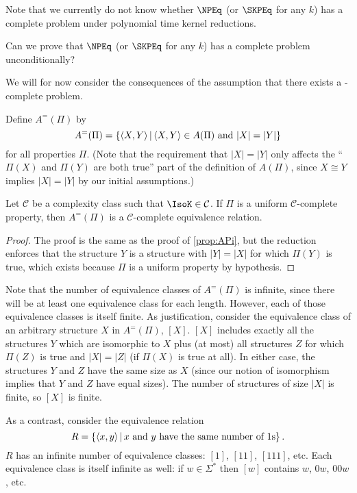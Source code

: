 Note that we currently do not know whether $\NPEq$ (or $\SKPEq$ for any $k$) has a complete problem under polynomial time kernel reductions.
\begin{openproblem}
  Can we prove that $\NPEq$ (or $\SKPEq$ for any $k$) has a complete problem unconditionally?
\end{openproblem}

We will for now consider the consequences of the assumption that there exists a \CEq-complete problem.

Define $A^=(\Pi)$ by
\begin{displaymath}
  A^=(\Pi) = \left\{ \left\langle X,Y\right\rangle \,\middle|\, \left\langle X,Y\right\rangle\in A(\Pi) \text{ and } |X|=|Y|\right\}
\end{displaymath}
for all properties $\Pi$.
(Note that the requirement that $|X|=|Y|$ only affects the ``$\Pi(X)$ and $\Pi(Y)$ are both true'' part of the definition of $A(\Pi)$, since $X\cong Y$ implies $|X|=|Y|$ by our initial assumptions.)

\begin{proposition}\label{prop:APieq}
  Let $\mathcal{C}$ be a complexity class such that $\IsoK\in\mathcal{C}$.
  If $\Pi$ is a uniform $\mathcal{C}$-complete property, then $A^=(\Pi)$ is a $\mathcal{C}$-complete equivalence relation.
\end{proposition}
\begin{proof}
  The proof is the same as the proof of \autoref{prop:APi}, but the reduction enforces that the structure $Y$ is a structure with $|Y|=|X|$ for which $\Pi(Y)$ is true, which exists because $\Pi$ is a uniform property by hypothesis.
\end{proof}

Note that the number of equivalence classes of $A^=(\Pi)$ is infinite, since there will be at least one equivalence class for each length.
However, each of those equivalence classes is itself finite.
As justification, consider the equivalence class of an arbitrary structure $X$ in $A^=(\Pi)$, $[X]$.
$[X]$ includes exactly all the structures $Y$ which are isomorphic to $X$ plus (at most) all structures $Z$ for which $\Pi(Z)$ is true and $|X|=|Z|$ (if $\Pi(X)$ is true at all).
In either case, the structures $Y$ and $Z$ have the same size as $X$ (since our notion of isomorphism implies that $Y$ and $Z$ have equal sizes).
The number of structures of size $|X|$ is finite, so $[X]$ is finite.

As a contrast, consider the equivalence relation
\begin{equation}\label{eq:ones}
  R=\left\{\left\langle x,y\right\rangle \,\middle|\, x\text{ and }y\text{ have the same number of }1\textnormal{s}\right\}.
\end{equation}
$R$ has an infinite number of equivalence classes: $[1]$, $[11]$, $[111]$, etc.
Each equivalence class is itself infinite as well: if $w\in\Sigma^*$ then $[w]$ contains $w$, $0w$, $00w$, etc.

